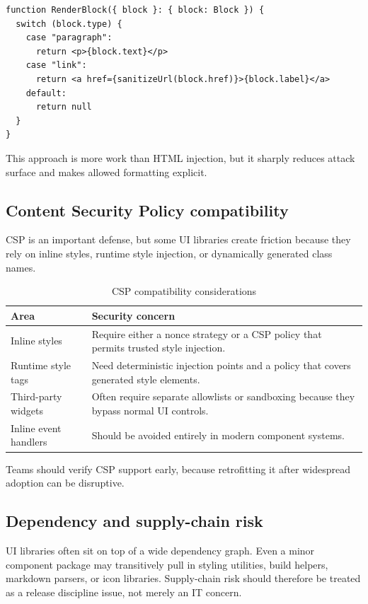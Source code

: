 \begin{verbatim}
function RenderBlock({ block }: { block: Block }) {
  switch (block.type) {
    case "paragraph":
      return <p>{block.text}</p>
    case "link":
      return <a href={sanitizeUrl(block.href)}>{block.label}</a>
    default:
      return null
  }
}
\end{verbatim}

This approach is more work than HTML injection, but it sharply reduces attack surface and makes allowed formatting explicit.

\subsection{Content Security Policy compatibility}
CSP is an important defense, but some UI libraries create friction because they rely on inline styles, runtime style injection, or dynamically generated class names.

\begin{table}[htbp]
  \centering
  \caption{CSP compatibility considerations}
  \begin{tabularx}{\textwidth}{@{}p{}X@{}}
    \toprule
    \textbf{Area} & \textbf{Security concern} \\
    \midrule
    Inline styles & Require either a nonce strategy or a CSP policy that permits trusted style injection. \\
    Runtime style tags & Need deterministic injection points and a policy that covers generated style elements. \\
    Third-party widgets & Often require separate allowlists or sandboxing because they bypass normal UI controls. \\
    Inline event handlers & Should be avoided entirely in modern component systems. \\
    \bottomrule
  \end{tabularx}
\end{table}

Teams should verify CSP support early, because retrofitting it after widespread adoption can be disruptive.

\subsection{Dependency and supply-chain risk}
UI libraries often sit on top of a wide dependency graph. Even a minor component package may transitively pull in styling utilities, build helpers, markdown parsers, or icon libraries. Supply-chain risk should therefore be treated as a release discipline issue, not merely an IT concern.

